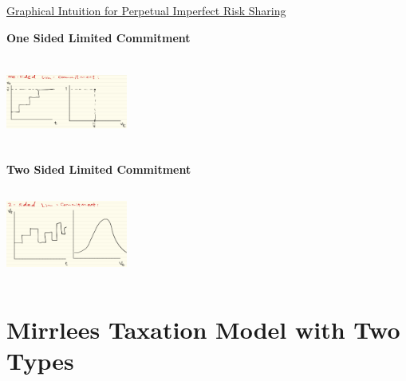 \documentclass{article}
\begin{document}
\underline{Graphical Intuition for Perpetual Imperfect Risk Sharing}
\begin{center}
\textbf{One Sided Limited Commitment} \par
\includegraphics[width=4cm, height=3cm]{pic17}
\end{center}
\begin{center}
\textbf{Two Sided Limited Commitment} \par
\includegraphics[width=4cm, height=3cm]{pic18}
\end{center}

\newpage

\section{Mirrlees Taxation Model with Two Types}
\end{document}
